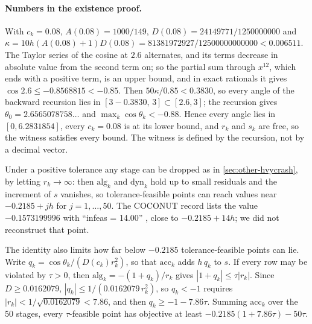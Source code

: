 \paragraph{Numbers in the existence proof.}
With $c_k=0.08$, $A(0.08)=1000/149$, $D(0.08)=24149771/1250000000$ and
$\kappa=10h(A(0.08)+1)D(0.08)=81381972927/12500000000000<0.006511$.
The Taylor series of the cosine at $2.6$ alternates, and its terms decrease in absolute value from the second term on;
so the partial sum through $x^{12}$, which ends with a positive term, is an upper bound, and in exact rationals it gives $\cos2.6\le-0.8568815<-0.85$.
Then $50\kappa/0.85<0.3830$, so every angle of the backward recursion lies in $[3-0.3830,\,3]\subset[2.6,3]$;
the recursion gives $\theta_0=2.6565078758\ldots$ and $\max_k\cos\theta_k<-0.88$.
Hence every angle lies in $[0,6.2831854]$, every $c_k=0.08$ is at its lower bound, and $r_k$ and $s_k$ are free, so the witness satisfies every bound.
The witness is defined by the recursion, not by a decimal vector.

\begin{certbox}
\end{certbox}

\begin{remark}\label{rem:hvycrash-tolerance}
Under a positive tolerance any stage can be dropped as in \cref{sec:other-hvycrash}, by letting $r_k\to\infty$: then $\text{alg}_k$ and $\text{dyn}_k$ hold up to small residuals and the increment of $s$ vanishes, so tolerance-feasible points can reach values near $-0.2185+jh$ for $j=1,\dots,50$.
The COCONUT record lists the value $-0.1573199996$ with ``infeas = 14.00'' \citep{coconut2026-globallib-gams-coconut-and-minlplib}, close to $-0.2185+14h$; we did not reconstruct that point.

The identity also limits how far below $-0.2185$ tolerance-feasible points can lie.
Write $q_k=\cos\theta_k/(D(c_k)r_k^2)$, so that $\text{acc}_k$ adds $h\,q_k$ to $s$.
If every row may be violated by $\tau>0$, then $\text{alg}_k=-(1+q_k)/r_k$ gives $|1+q_k|\le\tau|r_k|$.
Since $D\ge0.0162079$, $|q_k|\le1/(0.0162079\,r_k^2)$, so $q_k<-1$ requires $|r_k|<1/\sqrt{0.0162079}<7.86$, and then $q_k\ge-1-7.86\tau$.
Summing $\text{acc}_k$ over the 50 stages, every $\tau$-feasible point has objective at least $-0.2185(1+7.86\tau)-50\tau$.
\end{remark}

